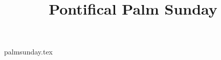\documentclass[letterpaper]{report}
\title{Pontifical Palm Sunday}
\begin{document}
\maketitle

{palmsunday.tex}

\printbibliography
\end{document}
